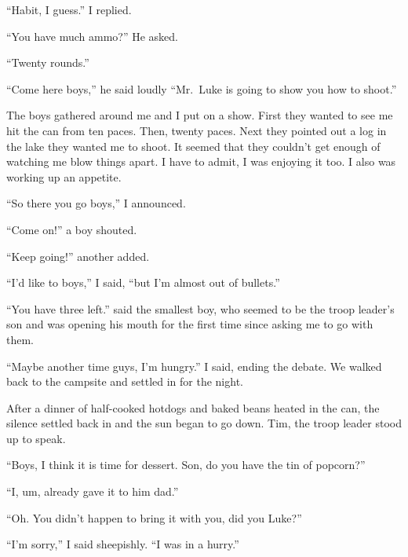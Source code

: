 ``Habit, I guess.'' I replied.



``You have much ammo?'' He asked.



``Twenty rounds.''



``Come here boys,'' he said loudly ``Mr.\ Luke is going to show you how
to shoot.''



The boys gathered around me and I put on a show. First they wanted
to see me hit the can from ten paces. Then, twenty paces. Next they
pointed out a log in the lake they wanted me to shoot. It seemed
that they couldn't get enough of watching me blow things apart. I
have to admit, I was enjoying it too. I also was working up an
appetite.



``So there you go boys,'' I announced.



``Come on!'' a boy shouted.



``Keep going!'' another added.



``I'd like to boys,'' I said, ``but I'm almost out of bullets.''



``You have three left.'' said the smallest boy, who seemed to be the
troop leader's son and was opening his mouth for the first time
since asking me to go with them.



``Maybe another time guys, I'm hungry.'' I said, ending the debate.
We walked back to the campsite and settled in for the night.



After a dinner of half-cooked hotdogs and baked beans heated in the
can, the silence settled back in and the sun began to go down. Tim,
the troop leader stood up to speak.



``Boys, I think it is time for dessert. Son, do you have the tin of
popcorn?''



``I, um, already gave it to him dad.''



``Oh. You didn't happen to bring it with you, did you Luke?''



``I'm sorry,'' I said sheepishly. ``I was in a hurry.''



